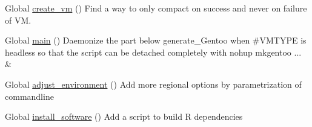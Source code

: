 
\begin{DoxyRefList}
\item[Global \mbox{\hyperlink{group__create_installer_ga629c1830d8dbae377193387edd199399}{create\+\_\+vm}} ()]\label{todo__todo000001}%
%
Find a way to only compact on success and never on failure of VM.  
\item[Global \mbox{\hyperlink{group__create_installer_ga51af30a60f9f02777c6396b8247e356f}{main}} ()]\label{todo__todo000002}%
%
Daemonize the part below generate\+\_\+\+Gentoo when \#\+V\+M\+T\+Y\+PE is {\ttfamily headless} so that the script can be detached completely with {\ttfamily nohup mkgentoo ... \&}  
\item[Global \mbox{\hyperlink{group__mk_file_system_gaa8c398850ee5921a441408b92f32d477}{adjust\+\_\+environment}} ()]\label{todo__todo000003}%
%
Add more regional options by parametrization of commandline  
\item[Global \mbox{\hyperlink{group__mk_file_system_gab693423f511d21225dbc60b2782190c3}{install\+\_\+software}} ()]\label{todo__todo000004}%
%
Add a script to build R dependencies 
\end{DoxyRefList}
